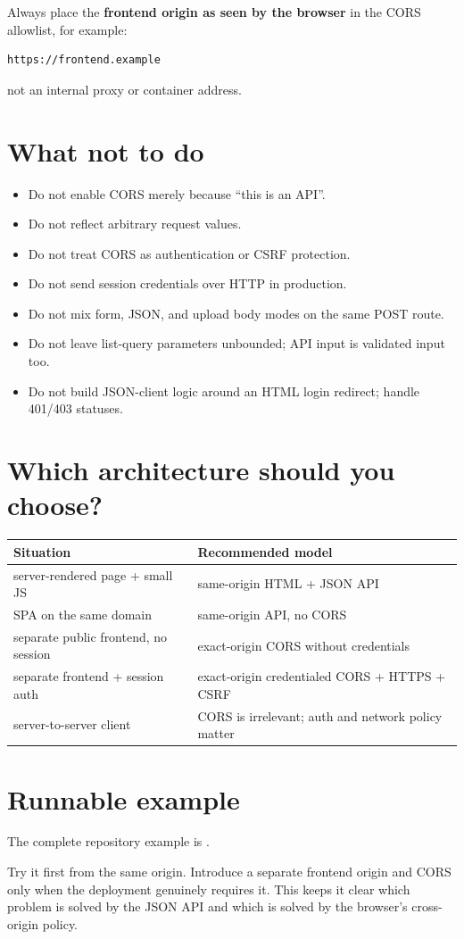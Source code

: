 Always place the \textbf{frontend origin as seen by the browser} in the CORS allowlist, for example:

\begin{lstlisting}
https://frontend.example
\end{lstlisting}

not an internal proxy or container address.

\section{What not to do}

\begin{itemize}
  \item Do not enable CORS merely because ``this is an API''.
  \item Do not reflect arbitrary request  values.
  \item Do not treat CORS as authentication or CSRF protection.
  \item Do not send session credentials over HTTP in production.
  \item Do not mix form, JSON, and upload body modes on the same POST route.
  \item Do not leave list-query parameters unbounded; API input is validated input too.
  \item Do not build JSON-client logic around an HTML login redirect; handle 401/403 statuses.
\end{itemize}

\section{Which architecture should you choose?}

\begin{center}
\begin{tabularx}{\textwidth}{@{}L{0.27\textwidth}Y@{}}
\toprule
\textbf{Situation} & \textbf{Recommended model} \\
\midrule
server-rendered page + small JS & same-origin HTML + JSON API \\
SPA on the same domain & same-origin API, no CORS \\
separate public frontend, no session & exact-origin CORS without credentials \\
separate frontend + session auth & exact-origin credentialed CORS + HTTPS + CSRF \\
server-to-server client & CORS is irrelevant; auth and network policy matter \\
\bottomrule
\end{tabularx}
\end{center}

\section{Runnable example}

The complete repository example is .

Try it first from the same origin. Introduce a separate frontend origin and CORS only when the deployment genuinely requires it. This keeps it clear which problem is solved by the JSON API and which is solved by the browser's cross-origin policy.
